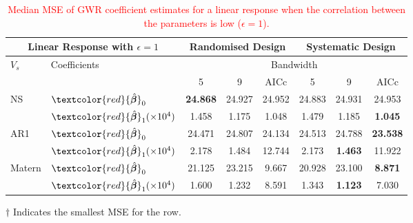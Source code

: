 \documentclass[a4paper]{article} 	%
\newcommand{\zc}[1]{\textcolor{red}{#1}}
\begin{document}
\begin{table}[!htp]
\centering
\begin{threeparttable}
\caption{\zc{Median MSE of GWR coefficient estimates for a linear response when the correlation between the parameters is low ($\epsilon=1$).}}\label{tb:MSElinear}
\begin{tabular}{ll|ccc|ccc}
\toprule
\multicolumn{2}{c}{Linear Response with $\epsilon=1$} & \multicolumn{3}{c}{Randomised Design} & \multicolumn{3}{c}{Systematic Design} \\ \midrule
\multirow{2}{*}{$V_s$} & \multirow{2}{*}{Coefficients}  & \multicolumn{6}{c}{Bandwidth}\\ 
&  & 5  & 9  & AICc & 5  & 9  & AICc \\ \midrule
\multirow{2}{*}{NS} & $\zc{\hat{\bm{\beta}}}_0$ & \bf{24.868}\tnote{$\dagger$}  & 24.927   & 24.952   & 24.883     & 24.931     & 24.953 \\
  &$\zc{\hat{\bm{\beta}}}_1 (\times 10^4)$ & 1.458   & 1.175   & 1.048 & 1.479    & 1.185   & \bf{1.045}\tnote{$\dagger$}   \\ \midrule
\multirow{2}{*}{AR1}& $\zc{\hat{\bm{\beta}}}_0$ & 24.471  & 24.807   & 24.134   & 24.513      & 24.788    & \bf{23.538}\tnote{$\dagger$}  \\
     & $\zc{\hat{\bm{\beta}}}_1 (\times 10^4)$ & 2.178   & 1.484    & 12.744     & 2.173    & \bf{1.463}\tnote{$\dagger$}     & 11.922  \\ \midrule
\multirow{2}{*}{Matern} & $\zc{\hat{\bm{\beta}}}_0$ & 21.125  & 23.215   & 9.667      & 20.928     & 23.100    & \bf{8.871}\tnote{$\dagger$} \\
      & $\zc{\hat{\bm{\beta}}}_1 (\times 10^4)$& 1.600   & 1.232    & 8.591      & 1.343     & \bf{1.123}\tnote{$\dagger$}  & 7.030   \\ 
\bottomrule
\end{tabular}
\begin{tablenotes}
\item[$\dagger$] \footnotesize Indicates the smallest MSE for the row.
\end{tablenotes}
\end{threeparttable}
\end{table}
\end{document}
